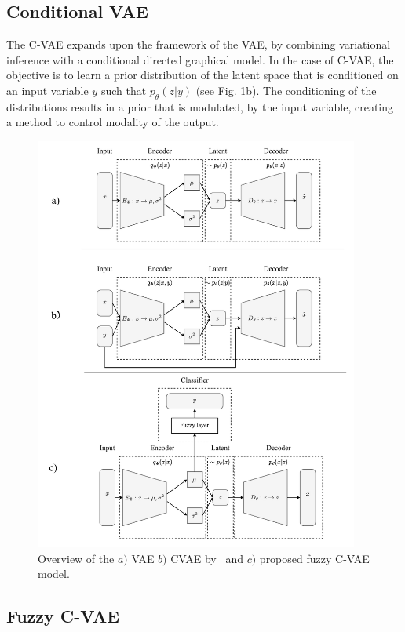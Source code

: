 \documentclass[runningheads]{llncs}
\begin{document}
\subsection{Conditional VAE}
The C-VAE expands upon the framework of the VAE, by combining variational inference with a conditional directed graphical model. 
In the case of C-VAE, the objective is to learn a prior distribution of the latent space that is conditioned on an input variable $y$ such that $p_\theta (z|y)$ (see Fig. \ref{fig:overview}b).
The conditioning of the distributions results in a prior that is modulated, by the input variable, creating a method to control modality of the output. 

\begin{figure}
    \centering
    \includegraphics[width=0.95\textwidth]{fig_1.pdf}
    \caption{Overview of the $a)$ VAE $b)$ CVAE by~\cite{SohnCVAE} and $c)$ proposed fuzzy C-VAE model.}
    \label{fig:overview}
\end{figure}

\subsection{Fuzzy C-VAE}
\end{document}
